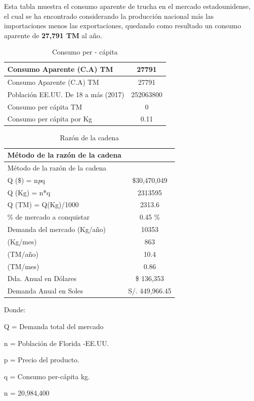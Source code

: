\documentclass[
  stu,
  floatsintext,
  longtable,
  a4paper,
  nolmodern,
  notxfonts,
  notimes,
  12pt,
  colorlinks=true,linkcolor=blue,citecolor=blue,urlcolor=blue]{apa7}
\begin{document}
Esta tabla muestra el consumo aparente de trucha en el mercado
estadounidense, el cual se ha encontrado considerando la producción
nacional más las importaciones menos las exportaciones, quedando como
resultado un consumo aparente de \textbf{27,791 TM} al año.

\begin{longtable}[]{@{}lc@{}}
\caption{Consumo per - cápita}\tabularnewline
\toprule\noalign{}
Consumo Aparente (C.A) TM & 27791 \\
\midrule\noalign{}
\endfirsthead
\toprule\noalign{}
Consumo Aparente (C.A) TM & 27791 \\
\midrule\noalign{}
\endhead
\bottomrule\noalign{}
\endlastfoot
Población EE.UU. De 18 a más (2017) & 252063800 \\
Consumo per cápita TM & 0 \\
Consumo per cápita por Kg & 0.11 \\
\end{longtable}

\begin{longtable}[]{@{}lc@{}}
\caption{Razón de la cadena}\tabularnewline
\toprule\noalign{}
Método de la razón de la cadena & \\
\midrule\noalign{}
\endfirsthead
\toprule\noalign{}
Método de la razón de la cadena & \\
\midrule\noalign{}
\endhead
\bottomrule\noalign{}
\endlastfoot
Q (\$) = n\emph{p}q & \$30,470,049 \\
Q (Kg) = n*q & 2313595 \\
Q (TM) = Q(Kg)/1000 & 2313.6 \\
\% de mercado a conquistar & 0.45 \% \\
Demanda del mercado (Kg/año) & 10353 \\
(Kg/mes) & 863 \\
(TM/año) & 10.4 \\
(TM/mes) & 0.86 \\
Dda. Anual en Dólares & \$ 136,353 \\
Demanda Anual en Soles & S/. 449,966.45 \\
\end{longtable}

Donde:

Q = Demanda total del mercado

n = Población de Florida -EE.UU.

p = Precio del producto.

q = Consumo per-cápita kg.

n = 20,984,400
\end{document}
